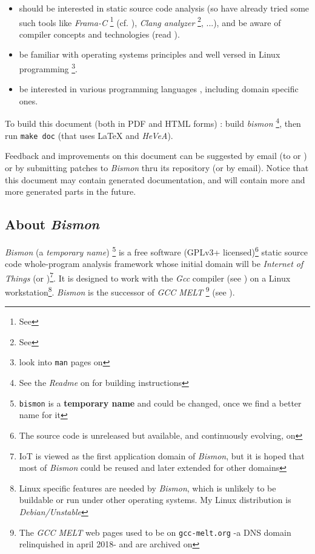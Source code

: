 \begin{itemize}
\item should be interested in static source code analysis (so have
  already tried some such tools like \emph{Frama-C} \footnote{See
    } (cf. \cite{Cuoq:2012:Frama-C}), \emph{Clang
    analyzer} \footnote{See },
  ...), and be aware of compiler concepts and technologies (read \cite{Aho:2006:DragonBook}).

\item be familiar with operating systems principles
  \cite{Tanenbaum:92:OS,ArpaciDusseau14-Book} and well
  versed in Linux programming
  \cite{Mitchell:2001:ALP,Kerrisk:2010:LinuxProgramming} \footnote{look
    into \texttt{man} pages on
    }.

  \item be interested in various programming languages
    \cite{Abelson1996:SICP,Scott:2007:PLP,Queinnec:1996:LSP},
    including domain specific ones.

\end{itemize}


To build this document (both in PDF and HTML forms) : build
\emph{bismon} \footnote{See the \emph{Readme} on
   for building
  instructions}, then run \texttt{make doc} (that uses {\LaTeX} and
\emph{HeVeA}).

Feedback and improvements on this document can be suggested by email
(to  or
) or by submitting patches to
\textit{Bismon} thru its  repository
(or by email). Notice that this document may contain generated
documentation, and will contain more and more generated parts in the
future.

\subsection{About \textit{Bismon}}

\textit{Bismon} (a \emph{temporary name}) \footnote{\texttt{bismon} is a \textbf{temporary name}
  and could be changed, once we find a better name for it} is a free
software (GPLv3+ licensed)\footnote{The source code is unreleased but available, and continuously evolving, on } static source code whole-program analysis framework whose
initial domain will be \emph{Internet of Things} (or
)\footnote{IoT is viewed as the first application
  domain of \textit{Bismon}, but it is hoped that most of
  \textit{Bismon} could be reused and later extended for other
  domains}. It is designed to work with the \textit{Gcc} compiler (see
) on a Linux workstation\footnote{Linux specific features are needed by \textit{Bismon}, which is unlikely to be buildable or run under other operating systems. My Linux distribution is \emph{Debian/Unstable}}. \textit{Bismon} is the
successor of \textit{GCC MELT} \footnote{The \textit{GCC MELT} web
  pages used to be on \texttt{gcc-melt.org} -a DNS domain relinquished
  in april 2018- and are archived on
  } (see \cite{Starynkevitch2007Multistage, starynkevitch-DSL2011}).

